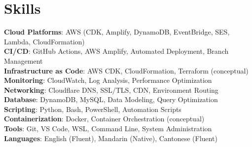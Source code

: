 \documentclass[letterpaper,11pt]{article}
\begin{document}
    \resumeSubHeadingListEnd

\section{Skills}
 \begin{itemize}[leftmargin=0.15in, label={}]
    \small{\item{
     \textbf{Cloud Platforms}{: AWS (CDK, Amplify, DynamoDB, EventBridge, SES, Lambda, CloudFormation)} \\
     \textbf{CI/CD}{: GitHub Actions, AWS Amplify, Automated Deployment, Branch Management} \\
     \textbf{Infrastructure as Code}{: AWS CDK, CloudFormation, Terraform (conceptual)} \\
     \textbf{Monitoring}{: CloudWatch, Log Analysis, Performance Optimization} \\
     \textbf{Networking}{: Cloudflare DNS, SSL/TLS, CDN, Environment Routing} \\
     \textbf{Database}{: DynamoDB, MySQL, Data Modeling, Query Optimization} \\
     \textbf{Scripting}{: Python, Bash, PowerShell, Automation Scripts} \\
     \textbf{Containerization}{: Docker, Container Orchestration (conceptual)} \\
     \textbf{Tools}{: Git, VS Code, WSL, Command Line, System Administration} \\
     \textbf{Languages}{: English (Fluent), Mandarin (Native), Cantonese (Fluent)}
    }}
 \end{itemize}

\end{document}
